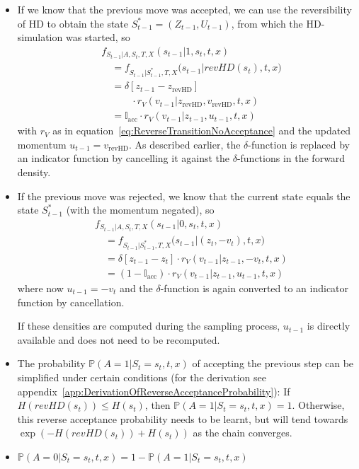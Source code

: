 \begin{itemize}
\item If we know that the previous move was accepted, we can use the reversibility of HD to obtain the state $S_{t-1}^* = (Z_{t-1}, U_{t-1})$, from which the HD-simulation was started, so
\begin{equation}
\begin{split}
&f_{S_{t-1} |A, S_t, T, X}(s_{t-1} | 1, s_t, t, x) \\
&\quad= f_{S_{t-1} |S_{t-1}^*, T, X}\big(s_{t-1} | revHD(s_t), t, x\big) \\
&\quad= \delta \left[z_{t-1} - z_{\textrm{revHD}} \right] \\
&\quad\qquad \cdot r_V(v_{t-1}|z_{\textrm{revHD}}, v_{\textrm{revHD}}, t, x) \\
&\quad= \mathbb{I}_\textrm{acc} \cdot r_V(v_{t-1}|z_{t-1}, u_{t-1}, t, x) 
\end{split}
\end{equation}
with $r_V$ as in equation~\eqref{eq:ReverseTransitionNoAcceptance} and the updated momentum $u_{t-1} = v_{\textrm{revHD}}$. As described earlier, the $\delta$-function is replaced by an indicator function by cancelling it against the $\delta$-functions in the forward density.
\item If the previous move was rejected, we know that the current state equals the state $S_{t-1}^*$ (with the momentum negated), so
\begin{equation}
\begin{split}
&f_{S_{t-1} |A, S_t, T, X}(s_{t-1} | 0, s_t, t, x) \\
&\quad= f_{S_{t-1} |S_{t-1}^*, T, X}\big(s_{t-1} | (z_t, -v_t), t, x\big) \\
&\quad= \delta \left[z_{t-1} - z_{t} \right] \cdot r_V(v_{t-1}|z_{t-1}, -v_t, t, x) \\
&\quad= (1 - \mathbb{I}_\textrm{acc}) \cdot r_V(v_{t-1}| z_{t-1}, u_{t-1}, t, x)
\end{split}
\end{equation}
where now $u_{t-1} = -v_t$ and the $\delta$-function is again converted to an indicator function by cancellation.

If these densities are computed during the sampling process, $u_{t-1}$ is directly available and does not need to be recomputed.
\item The probability $\mathbb{P}(A = 1|S_t = s_t, t, x)$ of accepting the previous step can be simplified under certain conditions (for the derivation see appendix~\ref{app:DerivationOfReverseAcceptanceProbability}): If $H(revHD(s_t)) \leq H(s_t)$, then $\mathbb{P}(A = 1|S_t = s_t, t, x) = 1$. Otherwise, this reverse acceptance probability needs to be learnt, but will tend towards $\exp(-H(revHD(s_t)) + H(s_t))$ as the chain converges. 
\item $\mathbb{P}(A = 0|S_t = s_t, t, x) = 1 - \mathbb{P}(A = 1|S_t = s_t, t, x)$
\end{itemize}

